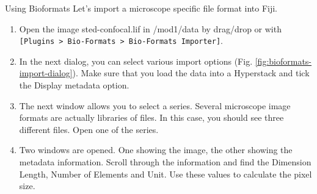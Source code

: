 \begin{taskbox}{Using Bioformats}
Let's import a microscope specific file format into Fiji.

\begin{enumerate}
	\item Open the image sted-confocal.lif in /mod1/data by drag/drop or with \texttt{[Plugins > Bio-Formats > Bio-Formats Importer]}.  
	\item In the next dialog, you can select various import options (Fig. \ref{fig:bioformats-import-dialog}). Make sure that you load the data into a Hyperstack and tick the Display metadata option.
	
	\begin{minipage}[t]{\linewidth}
		\begin{center}
		\medskip
		\label{fig:bioformats-import-dialog}
		\end{center}
	\end{minipage}
	
	\item The next window allows you to select a series. Several microscope image formats are actually libraries of files. In this case, you should see three different files. Open one of the series.
	\item Two windows are opened. One showing the image, the other showing the metadata information. Scroll through the information and find the Dimension Length, Number of Elements and Unit. Use these values to calculate the pixel size.
\end{enumerate}

\end{taskbox}



